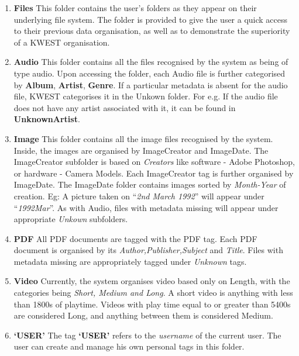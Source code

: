 \begin{enumerate}
\item \textbf{Files} \newline
This folder contains the user's folders as they  appear on their underlying file system. The folder is provided to give the user a quick access to their previous data organisation, as well as to demonstrate the superiority of a KWEST organisation.
\item \textbf{Audio} \newline
This folder contains all the files recognised by the system as being of type audio. Upon accessing the folder, each Audio file is further categorised by \textbf{Album}, \textbf{Artist}, \textbf{Genre}. If a particular metadata is absent for the audio file, KWEST categorises it in the Unkown folder. \newline
For e.g. If the audio file does not have any artist associated with it, it can be found in \textbf{UnknownArtist}.

\item \textbf{Image} \newline
This folder contains all the image files recognised by the system. Inside, the images are organised by ImageCreator and ImageDate. 
The ImageCreator subfolder is based on \textit{Creators} like software - Adobe Photoshop, or hardware - Camera Models. Each ImageCreator tag is further organised by ImageDate. 
The ImageDate folder contains images sorted by \textit{Month-Year} of creation. Eg: A picture taken on ``\textit{2nd March 1992}'' will appear under ``\textit{1992Mar}''.
As with Audio, files with metadata missing will appear under appropriate \textit{Unkown} subfolders.

\item \textbf{PDF} \newline
All PDF documents are tagged with the PDF tag. Each PDF document is organised by its \textit{Author,Publisher,Subject} and \textit{Title}. Files with metadata missing are appropriately tagged under \textit{Unknown} tags.

\item \textbf{Video} \newline
Currently, the system organises video based only on Length, with the categories being \textit{Short, Medium and Long}. A short video is anything with less than 1800s of playtime. Videos with play time equal to or greater than 5400s are considered Long, and anything between them is considered Medium.	

\item \textbf{`USER'} \newline
The tag \textbf{`USER'} refers to the \textit{username} of the current user. The user can create and manage his own personal tags in this folder.
\end{enumerate}

